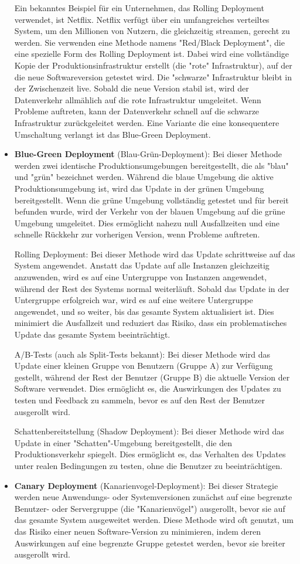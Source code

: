 \begin{itemize}
Ein bekanntes Beispiel für ein Unternehmen, das Rolling Deployment verwendet, ist Netflix. Netflix verfügt über ein umfangreiches verteiltes System, um den Millionen von Nutzern, die gleichzeitig streamen, gerecht zu werden. Sie verwenden eine Methode namens "Red/Black Deployment", die eine spezielle Form des Rolling Deployment ist. Dabei wird eine vollständige Kopie der Produktionsinfrastruktur erstellt (die "rote" Infrastruktur), auf der die neue Softwareversion getestet wird. Die "schwarze" Infrastruktur bleibt in der Zwischenzeit live. Sobald die neue Version stabil ist, wird der Datenverkehr allmählich auf die rote Infrastruktur umgeleitet. Wenn Probleme auftreten, kann der Datenverkehr schnell auf die schwarze Infrastruktur zurückgeleitet werden. Eine Variante die eine konsequentere Umschaltung verlangt ist das Blue-Green Deployment.
\item \textbf{Blue-Green Deployment} (Blau-Grün-Deployment):
Bei dieser Methode werden zwei identische Produktionsumgebungen bereitgestellt, die als "blau" und "grün" bezeichnet werden. Während die blaue Umgebung die aktive Produktionsumgebung ist, wird das Update in der grünen Umgebung bereitgestellt. Wenn die grüne Umgebung vollständig getestet und für bereit befunden wurde, wird der Verkehr von der blauen Umgebung auf die grüne Umgebung umgeleitet. Dies ermöglicht nahezu null Ausfallzeiten und eine schnelle Rückkehr zur vorherigen Version, wenn Probleme auftreten.

Rolling Deployment: Bei dieser Methode wird das Update schrittweise auf das System angewendet. Anstatt das Update auf alle Instanzen gleichzeitig anzuwenden, wird es auf eine Untergruppe von Instanzen angewendet, während der Rest des Systems normal weiterläuft. Sobald das Update in der Untergruppe erfolgreich war, wird es auf eine weitere Untergruppe angewendet, und so weiter, bis das gesamte System aktualisiert ist. Dies minimiert die Ausfallzeit und reduziert das Risiko, dass ein problematisches Update das gesamte System beeinträchtigt.

A/B-Tests (auch als Split-Tests bekannt): Bei dieser Methode wird das Update einer kleinen Gruppe von Benutzern (Gruppe A) zur Verfügung gestellt, während der Rest der Benutzer (Gruppe B) die aktuelle Version der Software verwendet. Dies ermöglicht es, die Auswirkungen des Updates zu testen und Feedback zu sammeln, bevor es auf den Rest der Benutzer ausgerollt wird.

Schattenbereitstellung (Shadow Deployment): Bei dieser Methode wird das Update in einer "Schatten"-Umgebung bereitgestellt, die den Produktionsverkehr spiegelt. Dies ermöglicht es, das Verhalten des Updates unter realen Bedingungen zu testen, ohne die Benutzer zu beeinträchtigen.
\item \textbf{Canary Deployment} (Kanarienvogel-Deployment):
Bei dieser Strategie werden neue Anwendungs- oder Systemversionen zunächst auf eine begrenzte Benutzer- oder Servergruppe (die "Kanarienvögel") ausgerollt, bevor sie auf das gesamte System ausgeweitet werden. Diese Methode wird oft genutzt, um das Risiko einer neuen Software-Version zu minimieren, indem deren Auswirkungen auf eine begrenzte Gruppe getestet werden, bevor sie breiter ausgerollt wird.


\end{itemize}
